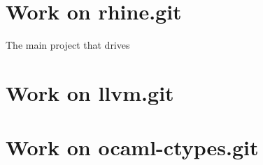 \documentclass{article}
\begin{document}
\section{Work on rhine.git}
The main project that drives
\section{Work on llvm.git}
\section{Work on ocaml-ctypes.git}
\end{document}
